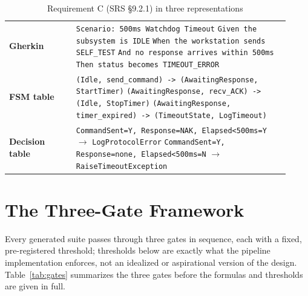 \documentclass[conference]{IEEEtran}
\begin{document}
  \begin{table}[t]
  \centering
  \caption{Requirement C (SRS \S9.2.1) in three representations}
  \label{tab:worked}
  \scriptsize
  \begin{tabular}{@{}p{0.22\linewidth}p{0.70\linewidth}@{}}
  \toprule
  \textbf{Gherkin} & \texttt{Scenario: 500ms Watchdog Timeout}\newline
  \texttt{Given the subsystem is IDLE}\newline
  \texttt{When the workstation sends SELF\_TEST}\newline
  \texttt{And no response arrives within 500ms}\newline
  \texttt{Then status becomes TIMEOUT\_ERROR} \\
  \addlinespace
  \textbf{FSM table} &
  \texttt{(Idle, send\_command) -> (AwaitingResponse, StartTimer)}\newline
  \texttt{(AwaitingResponse, recv\_ACK) -> (Idle, StopTimer)}\newline
  \texttt{(AwaitingResponse, timer\_expired) -> (TimeoutState, LogTimeout)} \\
  \addlinespace
  \textbf{Decision table} &
  \texttt{CommandSent=Y, Response=NAK, Elapsed<500ms=Y} $\rightarrow$ \texttt{LogProtocolError}\newline
  \texttt{CommandSent=Y, Response=none, Elapsed<500ms=N} $\rightarrow$ \texttt{RaiseTimeoutException} \\
  \bottomrule
  \end{tabular}
  \end{table}

  \section{The Three-Gate Framework}
  \label{sec:framework}

  Every generated suite passes through three gates in sequence, each with a
  fixed, pre-registered threshold; thresholds below are exactly what the
  pipeline implementation enforces, not an idealized or aspirational version of
  the design. Table~\ref{tab:gates} summarizes the three gates before the
  formulas and thresholds are given in full.
\end{document}
